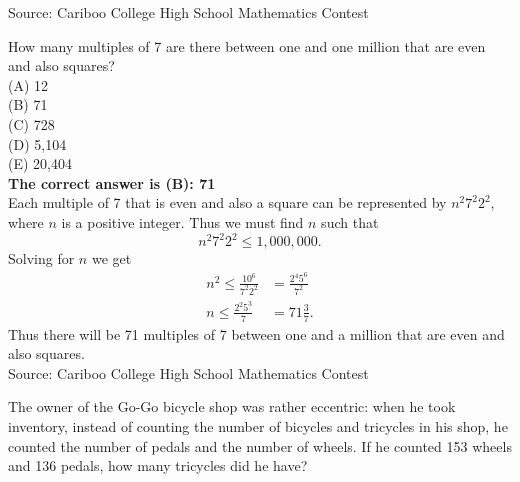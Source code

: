 \documentclass{article}
\begin{document}
\scriptsize
Source: Cariboo College High School Mathematics Contest

\normalsize
How many multiples of 7 are there between one and one million that are even and also squares?\\
(A) 12\\
(B) 71\\
(C) 728\\
(D) 5,104\\
(E) 20,404\\


\textbf{The correct answer is (B): 71}\\[1 ex]
Each multiple of 7 that is even and also a square can be represented by $n^{2}7^{2}2^{2}$, where $n$ is a positive integer. Thus we must find $n$ such that
\begin{equation*}
n^{2}7^{2}2^{2}\leq1,000,000.
\end{equation*}
Solving for $n$ we get
\begin{align*}
n^2\leq \frac{10^6}{7^{2}2^{2}}&=\frac{2^{4}5^{6}}{7^2}\\
n\leq \frac{2^{2}5^{3}}{7}&=71\frac{3}{7}.
\end{align*}
Thus there will be 71 multiples of 7 between one and a million that are even and also squares.
\\[5 ex]

\scriptsize
Source: Cariboo College High School Mathematics Contest

\normalsize
The owner of the Go-Go bicycle shop was rather eccentric: when he took inventory, instead of counting the number of bicycles and tricycles in his shop, he counted the number of pedals and the number of wheels. If he counted 153 wheels and 136 pedals, how many tricycles did he have?\\
\end{document}
